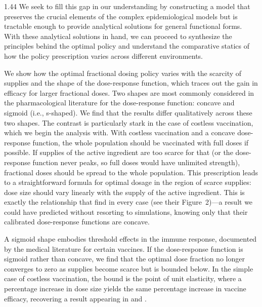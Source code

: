 \documentclass[12pt]{article}
\begin{document}
\begin{spacing}{1.44}
We seek to fill this gap in our understanding by constructing a model
that preserves the crucial elements of the complex epidemiological
models but is tractable enough to provide analytical solutions for
general functional forms. With these analytical solutions in hand, we
can proceed to synthesize the principles behind the optimal policy and
understand the comparative statics of how the policy prescription
varies across different environments.

We show how the optimal fractional dosing policy varies with the
scarcity of supplies and the shape of the dose-response function,
which traces out the gain in efficacy for larger fractional doses. Two
shapes are most commonly considered in the pharmacological literature
for the dose-response function: concave and sigmoid (i.e.,
s-shaped). We find that the results differ qualitatively across these
two shapes. The contrast is particularly stark in the case of costless
vaccination, which we begin the analysis with. With costless
vaccination and a concave dose-response function, the whole population
should be vaccinated with full doses if possible. If supplies of
the active ingredient are too scarce for that (or the dose-response function never peaks, so full doses would have unlimited strength), fractional doses should
be spread to the whole population. This prescription leads to a
straightforward formula for optimal dosage in the region of scarce
supplies: dose size should vary linearly with the supply of the active
ingredient. This is exactly the relationship that \citet{Riley2007}
find in every case (see their Figure~2)---a result we could have
predicted without resorting to simulations, knowing only that their
calibrated dose-response functions are concave.

A sigmoid shape embodies threshold effects in the immune response,
documented by the medical literature for certain vaccines.  If the
dose-response function is sigmoid rather than concave, we find that
the optimal dose fraction no longer converges to zero as supplies
become scarce but is bounded below. In the simple case of costless
vaccination, the bound is the point of unit elasticity, where a
percentage increase in dose size yields the same percentage increase
in vaccine efficacy, recovering a result appearing in
\citet{Riley2007} and \citet{Wu2016}.


\end{spacing}
\end{document}

